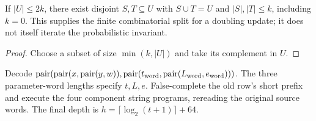 \begin{theorem}
  \label{thm:lowerbounds-algebraic-affine-round-subset}
  \leanok
  If $|U|\le2k$, there exist disjoint $S,T\subseteq U$ with
  $S\cup T=U$ and $|S|,|T|\le k$, including $k=0$.
  This supplies the finite combinatorial split for a doubling update;
  it does not itself iterate the probabilistic invariant.
\end{theorem}
\begin{proof}
  \leanok
  Choose a subset of size $\min(k,|U|)$ and take its complement in $U$.
\end{proof}

\begin{definition}
  \label{def:lowerbounds-algebraic-affine-round-program}
  \leanok
  Decode
  $\operatorname{pair}(\operatorname{pair}(x,\operatorname{pair}(y,w)),
    \operatorname{pair}(t_{\rm word},
      \operatorname{pair}(L_{\rm word},e_{\rm word})))$.
  The three parameter-word lengths specify $t,L,e$. False-complete the
  old row's short prefix and execute the four component string programs,
  rereading the original source words. The final depth is
  $h=\lceil\log_2(t+1)\rceil+64$.
\end{definition}

